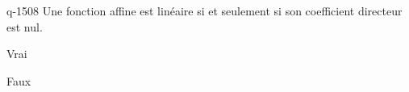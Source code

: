 \begin{truefalse}{q-1508}
Une fonction affine est linéaire si et seulement si son coefficient directeur est nul.
\item Vrai
\item* Faux
\end{truefalse}

